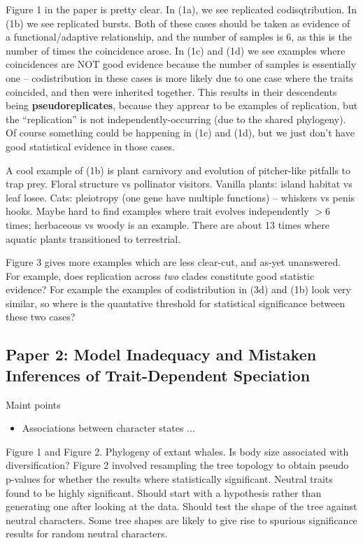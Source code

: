 \documentclass{article}
\begin{document}
Figure 1 in the paper is pretty clear. In (1a), we see replicated
codisqtribution. In (1b) we see replicated bursts. Both of these cases should be
taken as evidence of a functional/adaptive relationship, and the number of
samples is 6, as this is the number of times the coincidence arose. In (1c) and
(1d) we see examples where coincidences are NOT good evidence because the number
of samples is essentially one -- codistribution in these cases is more likely
due to one case where the traits coincided, and then were inherited together.
This results in their descendents being \textbf{pseudoreplicates}, because they
apprear to be examples of replication, but the ``replication'' is not
independently-occurring (due to the shared phylogeny). Of course something could
be happening in (1c) and (1d), but we just don't have good statistical evidence
in those cases.

A cool example of (1b) is plant carnivory and evolution of pitcher-like pitfalls
to trap prey. Floral structure vs pollinator visitors. Vanilla plants: island
habitat vs leaf losee. Cats: pleiotropy (one gene have multiple functions) --
whiskers vs penis hooks. Maybe hard to find examples where trait evolves
independently $>6$ times; herbaceous vs woody is an example. There are about
13 times where aquatic plants transitioned to terrestrial.

Figure 3 gives more examples which are less clear-cut, and as-yet unanswered.
For example, does replication across \textit{two} clades constitute good
statistic evidence? For example the examples of codistribution in (3d) and (1b)
look very similar, so where is the quantative threshold for statistical significance
between these two cases?

\subsection{Paper 2: Model Inadequacy and Mistaken Inferences of Trait-Dependent Speciation}

Maint points
\begin{itemize}
  \item Associations between character states ...
\end{itemize}

Figure 1 and Figure 2. Phylogeny of extant whales. Is body size associated with
diversification? Figure 2 involved resampling the tree topology to obtain pseudo
p-values for whether the results where statistically significant. Neutral traits
found to be highly significant. Should start with a hypothesis rather than
generating one after looking at the data. Should test the shape of the tree
against neutral characters. Some tree shapes are likely to give rise to spurious
significance results for random neutral characters.
\end{document}
